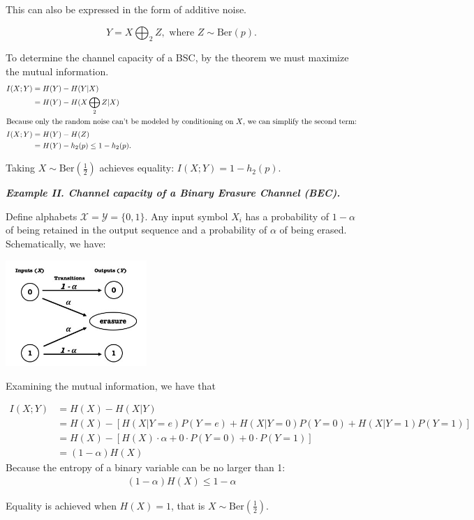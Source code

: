\documentclass[13pt]{article}
\newcommand{\eq}[1]{\begin{align*}#1\end{align*}}
\begin{document}
This can also be expressed in the form of additive noise.

\[
Y = X \bigoplus_2 Z, \text{ where } Z \sim \text{Ber}(p).
\]

To determine the channel capacity of a BSC, by the theorem we must maximize the mutual information.
\begin{align*}
I(X; Y) &= H(Y) - H(Y|X) \\
		&= H(Y) - H(X \bigoplus_2 Z | X) \\
\intertext{Because only the random noise can't be modeled by conditioning on $X$, we can simplify the second term:}
I(X; Y) &= H(Y) - H(Z) \\
        &= H(Y) - h_2(p) \leq 1 - h_2(p).
\end{align*}

Taking $X \sim \text{Ber}(\frac{1}{2})$ achieves equality: $I(X; Y) = 1 - h_2(p)$.

\textbf{\textit{Example II. Channel capacity of a Binary Erasure Channel (BEC).}}

Define alphabets $\mathcal{X} = \mathcal{Y} = \{ 0, 1 \}$. Any input symbol $X_i$ has a probability of $1 - \alpha$ of being retained in the output sequence and a probability of $\alpha$ of being erased.  Schematically, we have:

\includegraphics[width=0.4\textwidth]{img/bec.png}

Examining the mutual information, we have that

\begin{align*}
I(X; Y) &= H(X) - H(X|Y) \\
		&= H(X) - [H(X | Y=e) P(Y=e) + H(X | Y=0) P(Y = 0) + H(X | Y=1) P(Y=1)] \\
        &= H(X) - [H(X) \cdot \alpha + 0 \cdot P(Y=0) + 0 \cdot P(Y=1)] \\
        &= (1 - \alpha) H(X)
\end{align*}
Because the entropy of a binary variable can be no larger than 1:
\eq{(1 - \alpha) H(X) \leq 1 - \alpha}

Equality is achieved when $H(X) = 1$, that is $X \sim \text{Ber}(\frac{1}{2})$.
\end{document}
